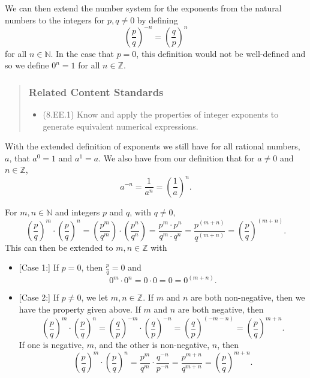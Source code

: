\documentclass[
]{book}
\providecommand{\tightlist}{%
  \setlength{\itemsep}{0pt}\setlength{\parskip}{0pt}}
\theoremstyle{definition}
\theoremstyle{definition}
\theoremstyle{definition}
\theoremstyle{remark}
\begin{document}
We can then extend the number system for the exponents from the natural numbers to the integers for \(p,q\neq 0\) by defining
\[\left(\frac{p}{q}\right)^{-n} = \left(\frac{q}{p}\right)^n\] for all \(n\in \mathbb{N}\). In the case that \(p=0\), this definition would not be well-defined and so we define \(0^n=1\) for all \(n\in \mathbb{Z}\).

\begin{quote}
\hypertarget{related-content-standards-10}{%
\subsubsection*{Related Content Standards}\label{related-content-standards-10}}

\begin{itemize}
\tightlist
\item
  (8.EE.1) Know and apply the properties of integer exponents to generate equivalent numerical expressions.
\end{itemize}
\end{quote}

With the extended definition of exponents we still have for all rational numbers, \(a\), that \(a^0=1\) and \(a^1=a\). We also have from our definition that for \(a\neq 0\) and \(n\in \mathbb{Z}\), \[a^{-n}=\frac{1}{a^n}=\left(\frac{1}{a}\right)^n.\]

For \(m,n \in \mathbb{N}\) and integers \(p\) and \(q\), with \(q\neq 0\),
\[\left(\frac{p}{q}\right)^m \cdot \left(\frac{p}{q}\right)^n = \left(\frac{p^m}{q^m} \right) \cdot \left(\frac{p^n}{q^n}\right) = \frac{p^m \cdot p^n}{q^m \cdot q^n} = \frac{p^{(m+n)}}{q^{(m+n)}} = \left(\frac{p}{q}\right)^{(m+n)}.\]
This can then be extended to \(m,n\in \mathbb{Z}\) with

\begin{itemize}
\tightlist
\item
  {[}Case 1:{]} If \(p=0\), then \(\frac{p}{q}=0\) and \[0^m\cdot 0^n = 0\cdot 0=0=0^{(m+n)}.\]
\item
  {[}Case 2:{]} If \(p\neq 0\), we let \(m,n\in \mathbb{Z}\).
  If \(m\) and \(n\) are both non-negative, then we have the property given above.
  If \(m\) and \(n\) are both negative, then \[\left(\frac{p}{q}\right)^{m} \cdot \left(\frac{p}{q}\right)^{n} = 
  \left(\frac{q}{p}\right)^{-m} \cdot \left(\frac{q}{p}\right)^{-n} =
  \left(\frac{q}{p}\right)^{(-m-n)} = \left(\frac{p}{q}\right)^{m+n}.\]
  If one is negative, \(m\), and the other is non-negative, \(n\), then
  \[ \left(\frac{p}{q}\right)^{m} \cdot \left(\frac{p}{q}\right)^{n} = \frac{p^m}{q^m} \cdot \frac{q^{-n}}{p^{-n}} = \frac{p^{m+n}}{q^{m+n}} =  \left(\frac{p}{q}\right)^{m+n}. \]
\end{itemize}
\end{document}
